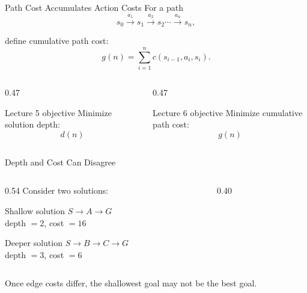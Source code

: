 \documentclass[aspectratio=169,10pt]{beamer}
\begin{document}
\begin{frame}[shrink=20]{Path Cost Accumulates Action Costs}
  For a path
  \[
    s_0 \xrightarrow{a_1} s_1 \xrightarrow{a_2} s_2 \cdots \xrightarrow{a_n} s_n,
  \]

  define cumulative path cost:
  \[
    g(n)=\sum_{i=1}^{n} c(s_{i-1},a_i,s_i).
  \]

  \begin{columns}[T,onlytextwidth]
    \begin{column}{0.47\textwidth}
      \begin{block}{Lecture 5 objective}
        Minimize solution depth:
        \[
          d(n)
        \]
      \end{block}
    \end{column}

    \begin{column}{0.47\textwidth}
      \begin{block}{Lecture 6 objective}
        Minimize cumulative path cost:
        \[
          g(n)
        \]
      \end{block}
    \end{column}
  \end{columns}
\end{frame}

\begin{frame}[shrink=20]{Depth and Cost Can Disagree}
  \begin{columns}[T,onlytextwidth]
    \begin{column}{0.54\textwidth}
      Consider two solutions:

      \begin{block}{Shallow solution}
        \centering
        $S\rightarrow A\rightarrow G$\\
        depth $=2$, cost $=16$
      \end{block}

      \begin{block}{Deeper solution}
        \centering
        $S\rightarrow B\rightarrow C\rightarrow G$\\
        depth $=3$, cost $=6$
      \end{block}
    \end{column}

    \begin{column}{0.40\textwidth}
    \end{column}
  \end{columns}

  \begin{keyidea}
    Once edge costs differ, the shallowest goal may not be the best goal.
  \end{keyidea}
\end{frame}
\end{document}
